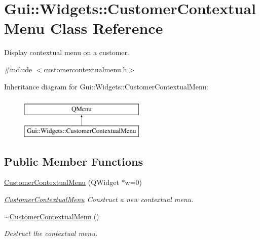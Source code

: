 \hypertarget{classGui_1_1Widgets_1_1CustomerContextualMenu}{\section{Gui\+:\+:Widgets\+:\+:Customer\+Contextual\+Menu Class Reference}
\label{classGui_1_1Widgets_1_1CustomerContextualMenu}
}


Display contextual menu on a customer.  




{\ttfamily \#include $<$customercontextualmenu.\+h$>$}

Inheritance diagram for Gui\+:\+:Widgets\+:\+:Customer\+Contextual\+Menu\+:\begin{figure}[H]
\begin{center}
\leavevmode
\includegraphics[height=2.000000cm]{d8/ded/classGui_1_1Widgets_1_1CustomerContextualMenu}
\end{center}
\end{figure}
\subsection*{Public Member Functions}
\begin{DoxyCompactItemize}
\item 
\hyperlink{classGui_1_1Widgets_1_1CustomerContextualMenu_ab8fc199bd6adf21f7dd5e881e0a73b16}{Customer\+Contextual\+Menu} (Q\+Widget $\ast$w=0)
\begin{DoxyCompactList}\small\item\em \hyperlink{classGui_1_1Widgets_1_1CustomerContextualMenu}{Customer\+Contextual\+Menu} Construct a new contextual menu. \end{DoxyCompactList}\item 
\hypertarget{classGui_1_1Widgets_1_1CustomerContextualMenu_a6814dcf744752f9026c85a9640cf23ef}{\hyperlink{classGui_1_1Widgets_1_1CustomerContextualMenu_a6814dcf744752f9026c85a9640cf23ef}{$\sim$\+Customer\+Contextual\+Menu} ()}\label{classGui_1_1Widgets_1_1CustomerContextualMenu_a6814dcf744752f9026c85a9640cf23ef}

\begin{DoxyCompactList}\small\item\em Destruct the contextual menu. \end{DoxyCompactList}\end{DoxyCompactItemize}


